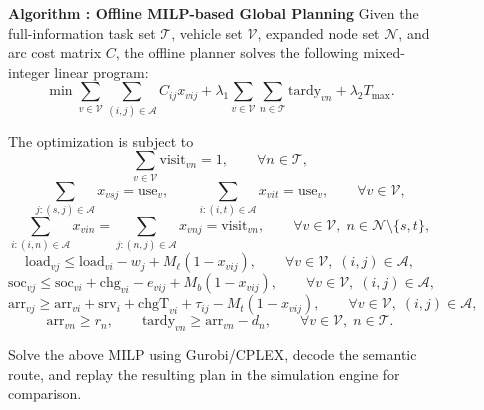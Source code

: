 \begin{figure}[t]
  \centering
  \label{alg:offline_milp_planning}
  \begin{minipage}{0.96\textwidth}
  \textbf{Algorithm \thealgorithm: Offline MILP-based Global Planning}
  \vspace{0.5em}
  Given the full-information task set \(\mathcal{T}\), vehicle set \(\mathcal{V}\), expanded node set \(\mathcal{N}\), and arc cost matrix \(C\), the offline planner solves the following mixed-integer linear program:
  \begin{equation}
  \min \sum_{v\in\mathcal{V}}\sum_{(i,j)\in\mathcal{A}} C_{ij}x_{vij}
  + \lambda_1 \sum_{v\in\mathcal{V}}\sum_{n\in\mathcal{T}} \mathrm{tardy}_{vn}
  + \lambda_2 T_{\max}.
  \end{equation}

  The optimization is subject to
  \begin{equation}
  \sum_{v\in\mathcal{V}} \mathrm{visit}_{vn}=1,
  \qquad \forall n\in\mathcal{T},
  \end{equation}
  \begin{equation}
  \sum_{j:(s,j)\in\mathcal{A}} x_{vsj}=\mathrm{use}_v,
  \qquad
  \sum_{i:(i,t)\in\mathcal{A}} x_{vit}=\mathrm{use}_v,
  \qquad \forall v\in\mathcal{V},
  \end{equation}
  \begin{equation}
  \sum_{i:(i,n)\in\mathcal{A}} x_{vin}
  =
  \sum_{j:(n,j)\in\mathcal{A}} x_{vnj}
  = \mathrm{visit}_{vn},
  \qquad \forall v\in\mathcal{V},\; n\in\mathcal{N}\setminus\{s,t\},
  \end{equation}
  \begin{equation}
  \mathrm{load}_{vj}
  \le
  \mathrm{load}_{vi}-w_j + M_{\ell}(1-x_{vij}),
  \qquad \forall v\in\mathcal{V},\; (i,j)\in\mathcal{A},
  \end{equation}
  \begin{equation}
  \mathrm{soc}_{vj}
  \le
  \mathrm{soc}_{vi}+\mathrm{chg}_{vi}-e_{vij}+M_b(1-x_{vij}),
  \qquad \forall v\in\mathcal{V},\; (i,j)\in\mathcal{A},
  \end{equation}
  \begin{equation}
  \mathrm{arr}_{vj}
  \ge
  \mathrm{arr}_{vi}+\mathrm{srv}_i+\mathrm{chgT}_{vi}+\tau_{ij}-M_t(1-x_{vij}),
  \qquad \forall v\in\mathcal{V},\; (i,j)\in\mathcal{A},
  \end{equation}
  \begin{equation}
  \mathrm{arr}_{vn}\ge r_n,
  \qquad
  \mathrm{tardy}_{vn}\ge \mathrm{arr}_{vn}-d_n,
  \qquad \forall v\in\mathcal{V},\; n\in\mathcal{T}.
  \end{equation}

  Solve the above MILP using Gurobi/CPLEX, decode the semantic route, and replay the resulting plan in the simulation engine for comparison.
  \end{minipage}
\end{figure}
